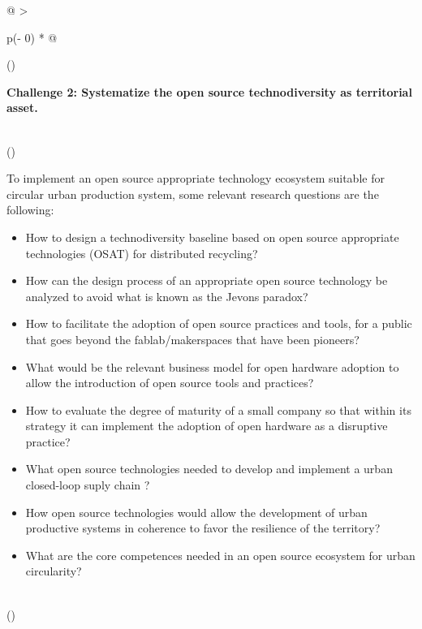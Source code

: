 \documentclass[
  12pt,
  a4paperpaper,
  onecolumn]{article}
\begin{document}
\begin{longtable}[]{@{}
  >{\raggedright\arraybackslash}p{(\columnwidth - 0\tabcolsep) * }@{}}
\toprule()
\begin{minipage}[b]{\linewidth}\raggedright
\textbf{Challenge 2: Systematize the open source technodiversity as
territorial asset.}
\end{minipage} \\
\midrule()
\endhead
\begin{minipage}[t]{\linewidth}\raggedright
To implement an open source appropriate technology ecosystem suitable
for circular urban production system, some relevant research questions
are the following:

\begin{itemize}
\item
  How to design a technodiversity baseline based on open source
  appropriate technologies (OSAT) for distributed recycling?
\item
  How can the design process of an appropriate open source technology be
  analyzed to avoid what is known as the Jevons paradox?
\item
  How to facilitate the adoption of open source practices and tools, for
  a public that goes beyond the fablab/makerspaces that have been
  pioneers?
\item
  What would be the relevant business model for open hardware adoption
  to allow the introduction of open source tools and practices?
\item
  How to evaluate the degree of maturity of a small company so that
  within its strategy it can implement the adoption of open hardware as
  a disruptive practice?
\item
  What open source technologies needed to develop and implement a urban
  closed-loop suply chain ?
\item
  How open source technologies would allow the development of urban
  productive systems in coherence to favor the resilience of the
  territory?
\item
  What are the core competences needed in an open source ecosystem for
  urban circularity?
\end{itemize}
\end{minipage} \\
\bottomrule()
\end{longtable}
\end{document}
